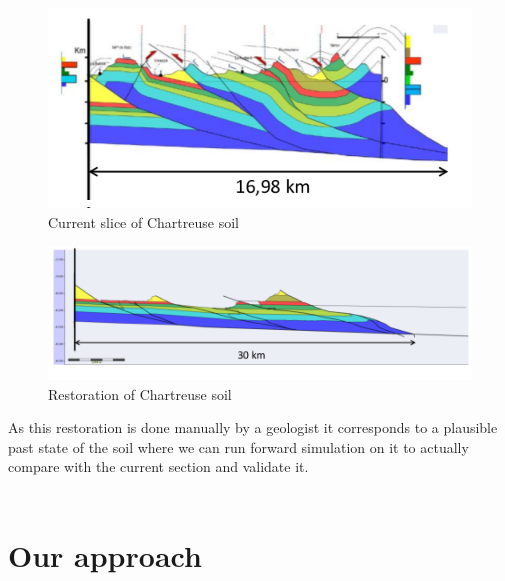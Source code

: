 \documentclass[a4paper,11pt]{article}
\begin{document}
\begin{figure}[H]
\centering
\includegraphics[scale=0.9]{Wraped_Section.png}
\caption{Current slice of Chartreuse soil}
\end{figure}

\begin{figure}[H]
\centering
\includegraphics[scale=0.7]{UnWraped_Section.png}
\caption{Restoration of Chartreuse soil}
\end{figure}

As this restoration is done manually by a geologist it corresponds to a plausible past state of the soil where we can run forward simulation on it to actually compare with the current section and validate it. \\\\

\section{Our approach}
\end{document}
